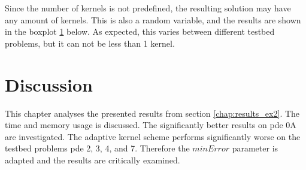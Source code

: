 \documentclass[./\jobname.tex]{subfiles}
\begin{document}
Since the number of kernels is not predefined, the resulting solution may have any amount of kernels. This is also a random variable, and the results are shown in the boxplot \ref{fig:pajade_kernels_boxplot} below. As expected, this varies between different testbed problems, but it can not be less than 1 kernel. 

\begin{figure}[H]
	\centering
	\noindent{}
	\label{fig:pajade_kernels_boxplot}
\end{figure}


\section{Discussion}

This chapter analyses the presented results from section \ref{chap:results_ex2}. The time and memory usage is discussed. The significantly better results on \gls{pde} 0A are investigated. The adaptive kernel scheme performs significantly worse on the testbed problems \gls{pde} 2, 3, 4, and 7. Therefore the $minError$ parameter is adapted and the results are critically examined. 
\end{document}
